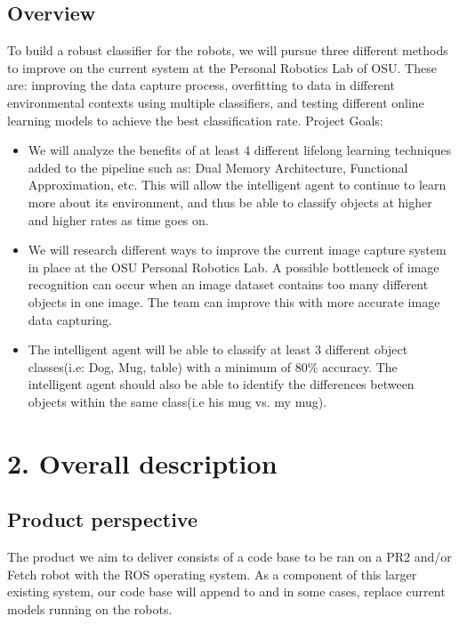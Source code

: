 \documentclass[draftclsnofoot, onecolumn, 10pt, compsoc]{IEEEtran}
\begin{document}
\subsection{Overview}
To build a robust classifier for the robots, we will pursue three different methods to improve on the current system at the Personal Robotics Lab of OSU. These are: improving the data capture process, overfitting to data in different environmental contexts using multiple classifiers, and testing different online learning models to achieve the best classification rate. Project Goals:
\begin{itemize}
\item We will analyze the benefits of at least 4 different lifelong learning techniques added to the pipeline such as: Dual Memory Architecture, Functional Approximation, etc. This will allow the intelligent agent to continue to learn more about its environment, and thus be able to classify objects at higher and higher rates as time goes on.

\item We will research different ways to improve the current image capture system in place at the OSU Personal Robotics Lab. A possible bottleneck of image recognition can occur when an image dataset contains too many different objects in one image. The team can improve this with more accurate image data capturing.
\item The intelligent agent will be able to classify at least 3 different object classes(i.e: Dog, Mug, table) with a minimum of 80\% accuracy. The intelligent agent should also be able to identify the differences between objects within the same class(i.e his mug vs. my mug).
\end{itemize}
\section{2. Overall description}
\subsection{Product perspective}
The product we aim to deliver consists of a code base to be ran on a PR2 and/or Fetch robot with the ROS operating system. As a component of this larger existing system, our code base will append to and in some cases, replace current models running on the robots.
\end{document}
